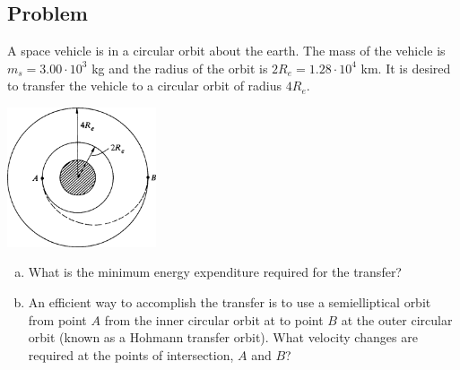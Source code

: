 \documentclass[solutions]{esg8012pset}
\begin{document}
\begin{solution}
\subsection{Problem}
  A space vehicle is in a circular orbit about the earth. The mass of the vehicle is $m_s = 3.00 \cdot 10^3$ kg and the radius of the orbit is $2R_e = 1.28 \cdot 10^4$ km. It is desired to transfer the vehicle to a circular orbit of radius $4R_e$.
  \begin{center}\includegraphics[width=0.33\textwidth]{ps10_2}\end{center}
  \begin{enumerate}[(a)]
    \item What is the minimum energy expenditure required for the transfer?
    \item An efficient way to accomplish the transfer is to use a semielliptical orbit from point $A$ from the inner circular orbit at to point $B$ at the outer circular orbit (known as a Hohmann transfer orbit). What velocity changes are required at the points of intersection, $A$ and $B$?
  \end{enumerate}

\end{solution}
\end{document}
